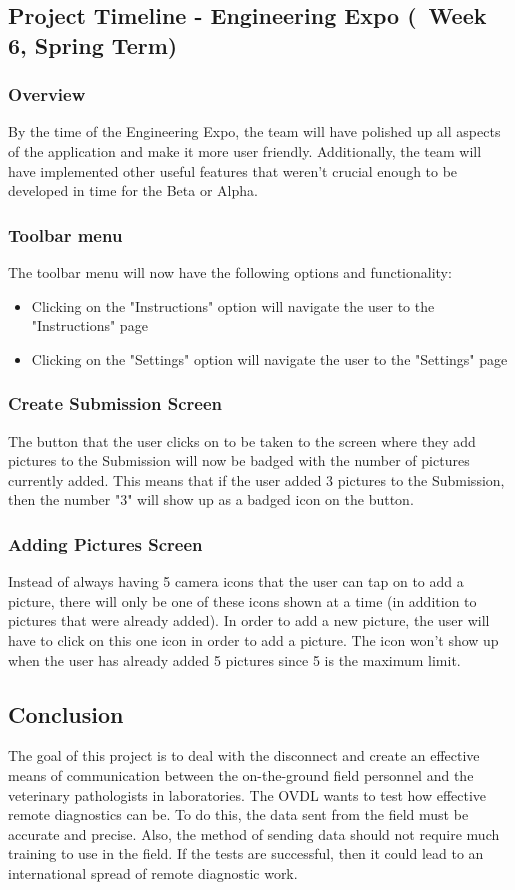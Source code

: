 \documentclass[onecolumn, draftclsnofoot,10pt, compsoc]{IEEEtran}
\begin{document}
\subsection{Project Timeline - Engineering Expo (~Week 6, Spring Term)}
\subsubsection{Overview}
By the time of the Engineering Expo, the team will have polished up all aspects of the application and make it more user friendly. Additionally, the team will have implemented other useful features that weren't crucial enough to be developed in time for the Beta or Alpha.

\subsubsection{Toolbar menu}
The toolbar menu will now have the following options and functionality:
\begin{itemize}
\item Clicking on the "Instructions" option will navigate the user to the "Instructions" page
\item Clicking on the "Settings" option will navigate the user to the "Settings" page
\end{itemize}

\subsubsection{Create Submission Screen}
The button that the user clicks on to be taken to the screen where they add pictures to the Submission will now be badged with the number of pictures currently added. This means that if the user added 3 pictures to the Submission, then the number "3" will show up as a badged icon on the button.

\subsubsection{Adding Pictures Screen}
Instead of always having 5 camera icons that the user can tap on to add a picture, there  will only be one of these icons shown at a time (in addition to pictures that were already added). In order to add a new picture, the user will have to click on this one icon in order to add a picture. The icon won't show up when the user has already added 5 pictures since 5 is the maximum limit.

\subsection{Conclusion}
The goal of this project is to deal with the disconnect and create an effective means of communication between the on-the-ground field personnel and the veterinary pathologists in laboratories. The OVDL wants to test how effective remote diagnostics can be. To do this, the data sent from the field must be accurate and precise. Also, the method of sending data should not require much training to use in the field. If the tests are successful, then it could lead to an international spread of remote diagnostic work. 
\end{document}
